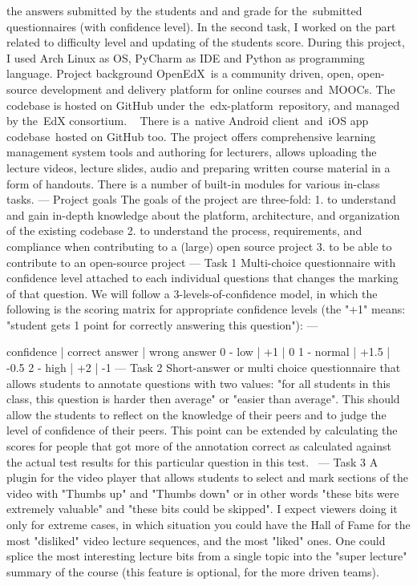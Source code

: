 the answers submitted by the students and and grade for the submitted questionnaires (with confidence level). 
In the second task, I worked on the part related to difficulty level and updating of the students score.
During this project, I used Arch Linux as OS, PyCharm as IDE and Python as programming language.
\vspace{0.5em}\newline
Project background
OpenEdX is a community driven, open, open-source development and delivery platform for online courses and MOOCs. 
The codebase is hosted on GitHub under the edx-platform repository, and managed by the EdX consortium.  
There is a native Android client and iOS app codebase hosted on GitHub too. 
The project offers comprehensive learning management system tools and authoring for lecturers, allows uploading the lecture videos, lecture slides, 
audio and preparing written course material in a form of handouts. 
There is a number of built-in modules for various in-class tasks.
---
Project goals
The goals of the project are three-fold:
1. to understand and gain in-depth knowledge about the platform, architecture, and organization of the existing codebase
2. to understand the process, requirements, and compliance when contributing to a (large) open source project
3. to be able to contribute to an open-source project
---
Task 1
Multi-choice questionnaire with confidence level attached to each individual questions that changes the marking of that question. 
We will follow a 3-levels-of-confidence model, in which the following is the scoring matrix for appropriate confidence levels 
(the "+1" means: "student gets 1 point for correctly answering this question"):
---

confidence	| correct answer 	| wrong answer
0 - low		| +1				| 0
1 - normal	| +1.5				| -0.5
2 - high	| +2				| -1
---
Task 2
Short-answer or multi choice questionnaire that allows students to annotate questions with two values: 
"for all students in this class, this question is harder then average" or "easier than average". 
This should allow the students to reflect on the knowledge of their peers and to judge the level of confidence of their peers. 
This point can be extended by calculating the scores for people that got more of the annotation correct as calculated against the actual test results 
for this particular question in this test. 
---
Task 3
A plugin for the video player that allows students to select and mark sections of the video with "Thumbs up" and "Thumbs down" or in other words 
"these bits were extremely valuable" and "these bits could be skipped". 
I expect viewers doing it only for extreme cases, in which situation you could have the Hall of Fame for the most "disliked" video lecture sequences, 
and the most "liked" ones. One could splice the most interesting lecture bits from a single topic into the "super lecture" summary of the course 
(this feature is optional, for the more driven teams).

